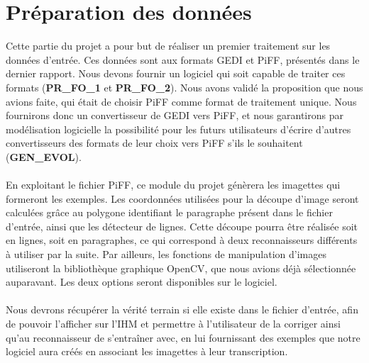 \section{Préparation des données}

Cette partie du projet a pour but de réaliser un premier traitement sur les
données d’entrée. Ces données sont aux formats GEDI et PiFF, présentés dans
le dernier rapport. Nous devons fournir un logiciel qui soit capable de
traiter ces formats (\textbf{PR\_FO\_1} et \textbf{PR\_FO\_2}). Nous avons validé
la proposition que nous avions faite, qui était de choisir PiFF comme format
de traitement unique. Nous fournirons donc un convertisseur de GEDI vers PiFF,
et nous garantirons par modélisation logicielle la possibilité pour les futurs
utilisateurs d’écrire d’autres convertisseurs des formats de leur choix vers
PiFF s’ils le souhaitent (\textbf{GEN\_EVOL}).

\paragraph{}
En exploitant le fichier PiFF, ce module du projet génèrera les imagettes qui
formeront les exemples. Les coordonnées utilisées pour la découpe d’image seront
calculées grâce au polygone identifiant le paragraphe présent dans le fichier
d’entrée, ainsi que les détecteur de lignes. Cette découpe pourra être réalisée
soit en lignes, soit en paragraphes, ce qui correspond à deux reconnaisseurs
différents à utiliser par la suite. Par ailleurs, les fonctions de manipulation
d’images utiliseront la bibliothèque graphique OpenCV, que nous avions déjà
sélectionnée auparavant. Les deux options seront disponibles sur le logiciel.

\paragraph{}
Nous devrons récupérer la vérité terrain si elle existe dans le fichier d’entrée,
afin de pouvoir l’afficher sur l’IHM et permettre à l’utilisateur de la corriger
ainsi qu’au reconnaisseur de s’entraîner avec, en lui fournissant des exemples
que notre logiciel aura créés en associant les imagettes à leur transcription.